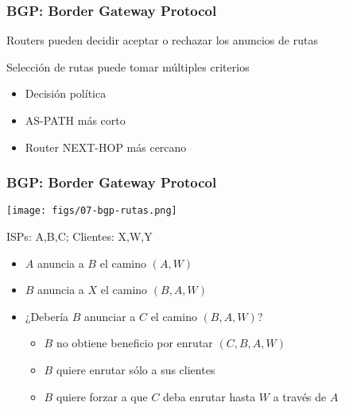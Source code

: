 \documentclass[letter]{beamer}
\begin{document}
\begin{frame}
  \frametitle{BGP: Border Gateway Protocol}

  Routers pueden decidir aceptar o rechazar los anuncios de rutas
  
  Selección de rutas puede tomar múltiples criterios
  \begin{itemize}
    \item Decisión política
    \item AS-PATH más corto
    \item Router NEXT-HOP más cercano
  \end{itemize}

\end{frame}
\begin{frame}
  \frametitle{BGP: Border Gateway Protocol}

  \begin{center}
    \texttt{[image: figs/07-bgp-rutas.png]}
  \end{center}

  ISPs: A,B,C; Clientes: X,W,Y
  \begin{itemize}
    \item $A$ anuncia a $B$ el camino $(A,W)$
    \item $B$ anuncia a $X$ el camino $(B,A,W)$
    \item ¿Debería $B$ anunciar a $C$ el camino $(B,A,W)$?
      \begin{itemize}
        \item $B$ no obtiene beneficio por enrutar $(C,B,A,W)$
        \item $B$ quiere enrutar sólo a sus clientes
        \item $B$ quiere forzar a que $C$ deba enrutar hasta $W$ a través de $A$
      \end{itemize}
  \end{itemize}

\end{frame}

\end{document}
